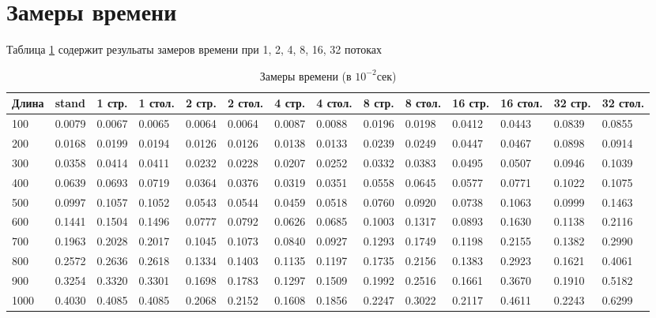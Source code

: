 \section{Замеры времени}\label{experimentgraph}

Таблица \ref{tab:resulttime} содержит резульаты замеров времени при 1, 2, 4, 8, 16, 32 потоках
\begin{table}[ht]
    \caption{Замеры времени (в $10^{-2}$сек)}
    \centering
    \scriptsize
\begin{tabular}{ l | l | l | l | l | l | l | l | l | l | l | l |l |l  }
Длина&     stand&1     стр.&1    стол.&2     стр.&2    стол.&4     стр.&4    стол.&8     стр.&8    стол.&16    стр.&16   стол.&32    стр.&32   стол. \\ \hline
100&  0.0079&  0.0067&  0.0065&  0.0064&  0.0064&  0.0087&  0.0088&  0.0196&  0.0198&  0.0412&  0.0443&  0.0839&  0.0855\\
200&  0.0168&  0.0199&  0.0194&  0.0126&  0.0126&  0.0138&  0.0133&  0.0239&  0.0249&  0.0447&  0.0467&  0.0898&  0.0914\\
300&  0.0358&  0.0414&  0.0411&  0.0232&  0.0228&  0.0207&  0.0252&  0.0332&  0.0383&  0.0495&  0.0507&  0.0946&  0.1039\\
400&  0.0639&  0.0693&  0.0719&  0.0364&  0.0376&  0.0319&  0.0351&  0.0558&  0.0645&  0.0577&  0.0771&  0.1022&  0.1075\\
500&  0.0997&  0.1057&  0.1052&  0.0543&  0.0544&  0.0459&  0.0518&  0.0760&  0.0920&  0.0738&  0.1063&  0.0999&  0.1463\\
600&  0.1441&  0.1504&  0.1496&  0.0777&  0.0792&  0.0626&  0.0685&  0.1003&  0.1317&  0.0893&  0.1630&  0.1138&  0.2116\\
700&  0.1963&  0.2028&  0.2017&  0.1045&  0.1073&  0.0840&  0.0927&  0.1293&  0.1749&  0.1198&  0.2155&  0.1382&  0.2990\\
800&  0.2572&  0.2636&  0.2618&  0.1334&  0.1403&  0.1135&  0.1197&  0.1735&  0.2156&  0.1383&  0.2923&  0.1621&  0.4061\\
900&  0.3254&  0.3320&  0.3301&  0.1698&  0.1783&  0.1297&  0.1509&  0.1992&  0.2516&  0.1661&  0.3670&  0.1910&  0.5182\\
1000&  0.4030&  0.4085&  0.4085&  0.2068&  0.2152&  0.1608&  0.1856&  0.2247&  0.3022&  0.2117&  0.4611&  0.2243&  0.6299\\
\end{tabular}
\label{tab:resulttime}
\end{table}



